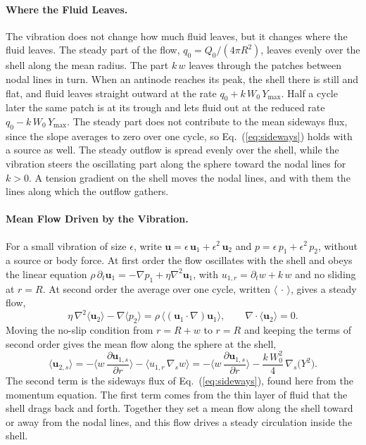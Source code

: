 \documentclass[12pt]{article}
\begin{document}
\paragraph{Where the Fluid Leaves.} The vibration does not change how much fluid leaves, but it changes where the fluid leaves. The steady part of the flow, $q_0 = Q_0/(4\pi R^2)$, leaves evenly over the shell along the mean radius. The part $k\,w$ leaves through the patches between nodal lines in turn. When an antinode reaches its peak, the shell there is still and flat, and fluid leaves straight outward at the rate $q_0 + k\,W_0\,Y_{\max}$. Half a cycle later the same patch is at its trough and lets fluid out at the reduced rate $q_0 - k\,W_0\,Y_{\max}$. The steady part does not contribute to the mean sideways flux, since the slope averages to zero over one cycle, so Eq.~(\ref{eq:sideways}) holds with a source as well. The steady outflow is spread evenly over the shell, while the vibration steers the oscillating part along the sphere toward the nodal lines for $k > 0$. A tension gradient on the shell moves the nodal lines, and with them the lines along which the outflow gathers.

\paragraph{Mean Flow Driven by the Vibration.} For a small vibration of size $\epsilon$, write $\bm{u} = \epsilon\,\bm{u}_1 + \epsilon^2\,\bm{u}_2$ and $p = \epsilon\,p_1 + \epsilon^2\,p_2$, without a source or body force. At first order the flow oscillates with the shell and obeys the linear equation $\rho\,\partial_t\bm{u}_1 = -\nabla p_1 + \eta\nabla^2\bm{u}_1$, with $u_{1,r} = \partial_t w + k\,w$ and no sliding at $r = R$. At second order the average over one cycle, written $\langle\,\cdot\,\rangle$, gives a steady flow,
%
\begin{equation}
\eta\,\nabla^2\langle\bm{u}_2\rangle - \nabla\langle p_2\rangle = \rho\,\big\langle(\bm{u}_1\cdot\nabla)\bm{u}_1\big\rangle, \qquad \nabla\cdot\langle\bm{u}_2\rangle = 0.
\end{equation}
%
Moving the no-slip condition from $r = R + w$ to $r = R$ and keeping the terms of second order gives the mean flow along the sphere at the shell,
%
\begin{equation}
\langle\bm{u}_{2,s}\rangle = -\Big\langle w\,\frac{\partial \bm{u}_{1,s}}{\partial r}\Big\rangle - \big\langle u_{1,r}\,\nabla_s w\big\rangle = -\Big\langle w\,\frac{\partial \bm{u}_{1,s}}{\partial r}\Big\rangle - \frac{k\,W_0^2}{4}\,\nabla_s\big(Y^2\big).
\end{equation}
%
The second term is the sideways flux of Eq.~(\ref{eq:sideways}), found here from the momentum equation. The first term comes from the thin layer of fluid that the shell drags back and forth. Together they set a mean flow along the shell toward or away from the nodal lines, and this flow drives a steady circulation inside the shell.
\end{document}
